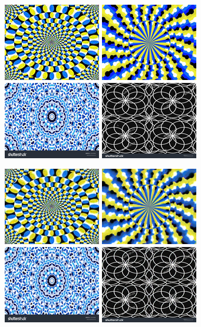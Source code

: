 \documentclass[journal]{IEEEtran}
\begin{document}
\begin{figure}
  \centering
  \includegraphics[width=0.24\linewidth]{fig/rotate-0.png}
  \includegraphics[width=0.24\linewidth]{fig/rotate-1.png}
  \includegraphics[width=0.24\linewidth]{fig/control-0.png}
  \includegraphics[width=0.24\linewidth]{fig/control-1.png}

  \includegraphics[width=0.24\linewidth]{fig/rotate-0-7.png}
  \includegraphics[width=0.24\linewidth]{fig/rotate-1-7.png}
  \includegraphics[width=0.24\linewidth]{fig/control-0-7.png}
  \includegraphics[width=0.24\linewidth]{fig/control-1-7.png}


\end{figure}
\end{document}
